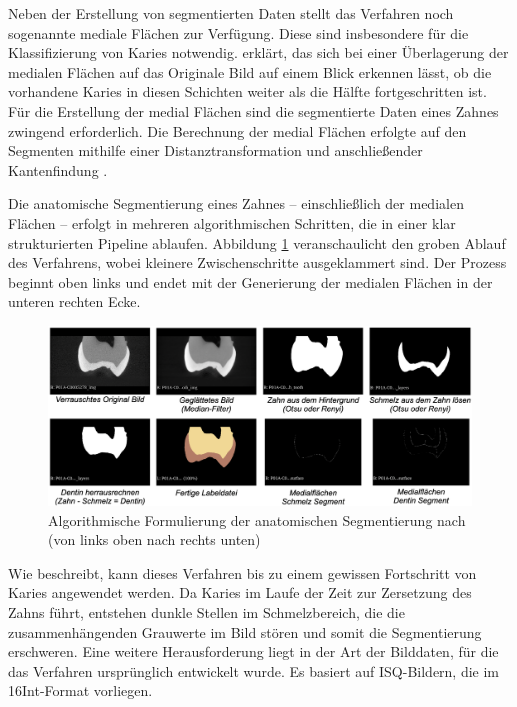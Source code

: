 Neben der Erstellung von segmentierten Daten stellt das Verfahren noch
sogenannte mediale Flächen zur Verfügung. Diese sind insbesondere für die Klassifizierung
von Karies notwendig. \citet[S.~42]{hoffmann2020} erklärt, das sich bei einer
Überlagerung der medialen Flächen auf das Originale Bild auf einem Blick
erkennen lässt, ob die vorhandene Karies in diesen Schichten weiter als die Hälfte
fortgeschritten ist. Für die Erstellung der medial Flächen sind die segmentierte
Daten eines Zahnes zwingend erforderlich. Die Berechnung der medial Flächen erfolgte
auf den Segmenten mithilfe einer Distanztransformation und anschließender Kantenfindung
\citep[vgl.][S.~42]{hoffmann2020}.

Die anatomische Segmentierung eines Zahnes – einschließlich der medialen Flächen
– erfolgt in mehreren algorithmischen Schritten, die in einer klar strukturierten
Pipeline ablaufen. Abbildung \ref{fig:anatomische_segmentierung} veranschaulicht
den groben Ablauf des Verfahrens, wobei kleinere Zwischenschritte ausgeklammert sind.
Der Prozess beginnt oben links und endet mit der Generierung der medialen
Flächen in der unteren rechten Ecke.

\begin{figure}[h]
	\centering
	\includegraphics[width=1\textwidth]{img/anatomischeSegmentierung.png}
	\caption{Algorithmische Formulierung der anatomischen Segmentierung nach
	\citet{hoffmann2020} (von links oben nach rechts unten)}
	\label{fig:anatomische_segmentierung}
\end{figure}

Wie \citet[S.~55]{hoffmann2020} beschreibt, kann dieses Verfahren bis zu einem gewissen
Fortschritt von Karies angewendet werden. Da Karies im Laufe der Zeit zur
Zersetzung des Zahns führt, entstehen dunkle Stellen im Schmelzbereich, die die
zusammenhängenden Grauwerte im Bild stören und somit die Segmentierung
erschweren. Eine weitere Herausforderung liegt in der Art der Bilddaten, für die
das Verfahren ursprünglich entwickelt wurde. Es basiert auf \ac{ISQ}-Bildern, die
im \ac{16Int}-Format vorliegen.

